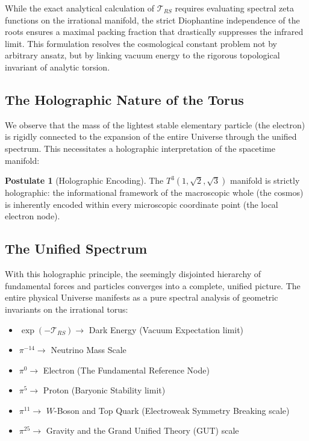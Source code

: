 \documentclass[onecolumn,aps,prd,superscriptaddress,nofootinbib,amsmath,amssymb]{revtex4-2}
\theoremstyle{definition}
\newtheorem{postulate}[theorem]{Postulate}
\theoremstyle{remark}
\newcommand{\Tthree}{T^3(1,\sqrt{2},\sqrt{3})}
\begin{document}
While the exact analytical calculation of $\mathcal{T}_{RS}$ requires evaluating spectral zeta functions on the irrational manifold, the strict Diophantine independence of the roots ensures a maximal packing fraction that drastically suppresses the infrared limit. This formulation resolves the cosmological constant problem not by arbitrary ansatz, but by linking vacuum energy to the rigorous topological invariant of analytic torsion.

\subsection{The Holographic Nature of the Torus}

We observe that the mass of the lightest stable elementary particle (the electron) is rigidly connected to the expansion of the entire Universe through the unified spectrum. This necessitates a holographic interpretation of the spacetime manifold:

\begin{postulate}[Holographic Encoding]
The $\Tthree$ manifold is strictly holographic: the informational framework of the macroscopic whole (the cosmos) is inherently encoded within every microscopic coordinate point (the local electron node).
\end{postulate}

\subsection{The Unified Spectrum}
With this holographic principle, the seemingly disjointed hierarchy of fundamental forces and particles converges into a complete, unified picture. The entire physical Universe manifests as a pure spectral analysis of geometric invariants on the irrational torus:

\begin{itemize}[noitemsep]
\item $\exp(-\mathcal{T}_{RS}) \rightarrow$ Dark Energy (Vacuum Expectation limit)
\item $\pi^{-14} \rightarrow$ Neutrino Mass Scale
\item $\pi^{0} \rightarrow$ Electron (The Fundamental Reference Node)
\item $\pi^{5} \rightarrow$ Proton (Baryonic Stability limit)
\item $\pi^{11} \rightarrow$ $W$-Boson and Top Quark (Electroweak Symmetry Breaking scale)
\item $\pi^{25} \rightarrow$ Gravity and the Grand Unified Theory (GUT) scale
\end{itemize}
\end{document}
